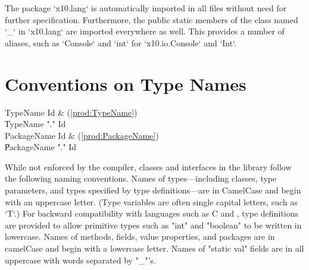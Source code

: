 The package \xcd`x10.lang` is automatically imported in all
files without need for further specification.
Furthermore, the public static members of the class named \xcd`_` in
\xcd`x10.lang` are imported everywhere as well. This provides a number of
aliases, such as \xcd`Console` and \xcd`int` for \xcd`x10.io.Console` and
\xcd`Int`. 




\section{Conventions on Type Names}

\begin{bbgrammar}
            TypeName \: Id & (\ref{prod:TypeName}) \\
                     \| TypeName \xcd"." Id \\
         PackageName \: Id & (\ref{prod:PackageName}) \\
                     \| PackageName \xcd"." Id \\
\end{bbgrammar}


While not enforced by the compiler, classes and interfaces
in the \Xten{} library follow the following naming conventions.
Names of types---including classes,
type parameters, and types specified by type definitions---are in
CamelCase and begin with an uppercase letter.  (Type variables are often
single capital letters, such as \xcd`T`.)
For backward
compatibility with languages such as C and \java{}, type
definitions are provided to allow primitive types
such as \xcd"int" and \xcd"boolean" to be written in lowercase.
Names of methods, fields, value properties, and packages are in camelCase and
begin with a lowercase letter. 
Names of \xcd"static val" fields are in all uppercase with words
separated by \xcd"_"'s.
